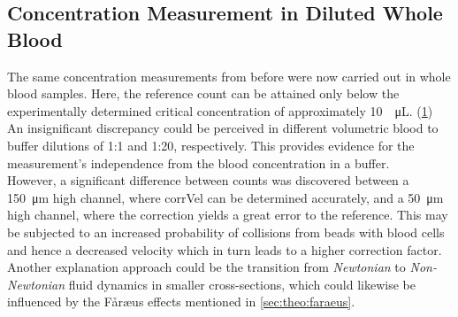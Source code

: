 \subsection{Concentration Measurement in Diluted Whole Blood}
\label{sec:res:wholeBlood}
The same concentration measurements from before were now carried out in whole blood samples. Here, the reference count can be attained only below the experimentally determined critical concentration of approximately \SI{10}{\per\micro\liter}. (\cref{fig:conc:blood}) An insignificant discrepancy could be perceived in different volumetric blood to buffer dilutions of 1:1 and 1:20, respectively. This provides evidence for the measurement's independence from the blood concentration in a buffer. \\
However, a significant difference between counts was discovered between a \SI{150}{\micro\meter} high channel, where \gls{corrVel} can be determined accurately, and a \SI{50}{\micro\meter} high channel, where the correction yields a great error to the reference. This may be subjected to an increased probability of collisions from beads with blood cells and hence a decreased velocity which in turn leads to a higher correction factor. Another explanation approach could be the transition from \textit{Newtonian} to \textit{Non-Newtonian} fluid dynamics in smaller cross-sections, which could likewise be influenced by the F\aa{}r\ae{}us effects mentioned in \cref{sec:theo:faraeus}.
\begin{figure}[h!]
	\centering
	 \hfill
	\addtocounter{subfigure}{-1}
	\label{fig:conc:blood}
\end{figure}
\clearpage
